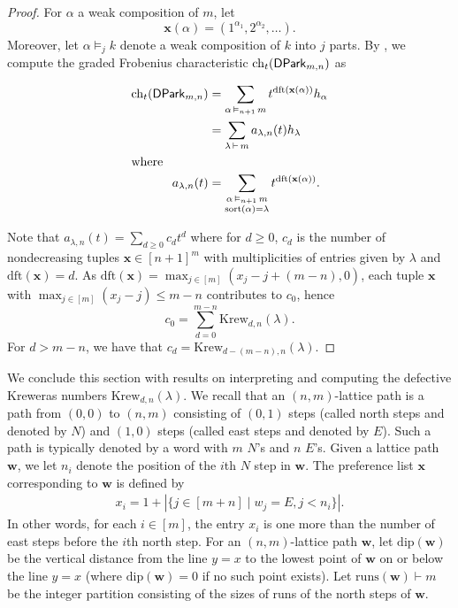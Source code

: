 \documentclass[11pt,reqno]{BICA}
\theoremstyle{definition}
\newcommand{\ch}{\mathrm{ch}}
\newcommand{\sort}{\mathrm{sort}}
\newcommand{\Krew}{\mathrm{Krew}}
\newcommand{\runs}{\mathrm{runs}}
\newcommand{\dip}{\mathrm{dip}}
\newcommand{\DPark}{{{\sf DPark}}}
\newcommand{\x}{\mathbf{x}}
\newcommand{\w}{\mathbf{w}}
\newcommand{\de}{\mathrm{dft}}
\begin{document}
\begin{proof} For $\alpha$ a weak composition of $m$, let \[\x(\alpha)=(1^{\alpha_1},2^{\alpha_2},\ldots).\] Moreover, let $\alpha \vDash_{j}k$ denote a weak composition of $k$ into $j$ parts. By , we compute the graded Frobenius characteristic $\ch_t(\DPark_{m,n})$ as

    \begin{align*}
    \ch_t(\DPark_{m,n})&=\sum_{\alpha\,\vDash_{n+1}\,m}t^{\de(\x(\alpha))}h_\alpha\\
&=\sum_{\lambda\,\vdash\,m}
a_{\lambda,n}(t)h_\lambda\\
\intertext{where}
        a_{\lambda,n}(t)&=\sum_{
    \substack{\alpha\,\vDash_{n+1}\,m
\\\sort(\alpha)=\lambda}}t^{\de(\x(\alpha))}.
    \end{align*}
    
    Note that $a_{\lambda,n}(t)=\sum_{d\geq0}c_dt^d$ where for $d\geq 0$, $c_d$ is the number of nondecreasing tuples $\x\in[n+1]^m$ with multiplicities of entries given by $\lambda$ and $\de(\x)=d$. As $\de(\x)=\max_{j\in[m]}(x_j-j+(m-n),0)$, each tuple $\x$ with $\max_{j\in[m]}(x_j-j)\leq m-n$ contributes to $c_0$, hence \[c_0=\sum
    _{d=0}^{m-n}\Krew_{d,n}(\lambda).\]
    For $d>m-n$, we have that $c_d=\Krew_{d-(m-n),n}(\lambda)$.
\end{proof}

We conclude this section with results on interpreting and computing the defective Kreweras numbers $\Krew_{d,n}(\lambda)$. We recall that an $(n, m)$-lattice path is a path from $(0, 0)$ to $(n,m)$ consisting of $(0, 1)$ steps (called north steps and denoted by $N$) and $(1, 0)$ steps (called east steps and denoted by $E$). Such a path is typically denoted by a word with $m$ $N$'s and $n$ $E$'s. Given a lattice path $\w$, we let $n_i$ denote the position of the $i$th $N$ step in $\w$. The  preference list $\x$ corresponding to $\w$ is defined by
\begin{align}
    x_i = 1 + \left|\{j \in [m+n] \mid w_j = E, j < n_i\}\right|. \label{eq:pref_path_bij}
\end{align}
In other words, for each $i\in[m]$, the entry $x_i$ is one more than the number of east steps before the $i$th north step. For an $(n,m)$-lattice path $\w$, let $\dip(\w)$ be the vertical distance from the line $y=x$ to the lowest point of $\w$ on or below the line $y=x$ (where $\dip(\w)=0$ if no such point exists). Let $\runs(\w)\vdash m$ be the integer partition consisting of the sizes of runs of the north steps of $\w$.
\end{document}
